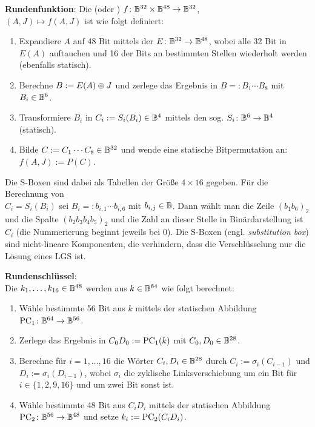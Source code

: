 \textbf{Rundenfunktion}:
Die  (oder )
$f\colon \mathbb{B}^{32} \times \mathbb{B}^{48} \rightarrow \mathbb{B}^{32}$,\\
$(A,J) \mapsto f(A,J)$
ist wie folgt definiert:
\begin{enumerate}
    \item
    Expandiere $A$ auf 48 Bit mittels der 
    $E\colon \mathbb{B}^{32} \rightarrow \mathbb{B}^{48}$,
    wobei alle 32 Bit in $E(A)$ auftauchen und 16 der Bits an bestimmten Stellen wiederholt werden
    (ebenfalls statisch).

    \item
    Berechne $B := E(A) \oplus J$ und zerlege das Ergebnis in $B =: B_1 \cdots B_8$ mit
    $B_i \in \mathbb{B}^6$.

    \item
    Transformiere $B_i$ in $C_i := S_i(B_i) \in \mathbb{B}^4$ mittels den sog. 
    $S_i\colon \mathbb{B}^6 \rightarrow \mathbb{B}^4$
    (statisch).

    \item
    Bilde $C := C_1 \cdots C_8 \in \mathbb{B}^{32}$ und wende eine statische Bitpermutation an:
    $f(A, J) := P(C)$.
\end{enumerate}
Die S-Boxen sind dabei als Tabellen der Größe $4 \times 16$ gegeben.
Für die Berechnung von\\
$C_i = S_i(B_i)$ sei $B_i =: b_{i,1} \cdots b_{i,6}$ mit
$b_{i,j} \in \mathbb{B}$.
Dann wählt man die Zeile $(b_1 b_6)_2$ und die Spalte $(b_2 b_3 b_4 b_5)_2$ und die Zahl an dieser
Stelle in Binärdarstellung ist $C_i$
(die Nummerierung beginnt jeweils bei $0$).
Die S-Boxen (engl. \emph{substitution box}) sind nicht-lineare Komponenten, die verhindern,
dass die Verschlüsselung nur die Lösung eines LGS ist.

\textbf{Rundenschlüssel}:\\
Die  $k_1, \dotsc, k_{16} \in \mathbb{B}^{48}$ werden aus
$k \in \mathbb{B}^{64}$ wie folgt berechnet:
\begin{enumerate}
    \item
    Wähle bestimmte 56 Bit aus $k$ mittels der statischen Abbildung
    $\operatorname{PC}_1\colon \mathbb{B}^{64} \rightarrow \mathbb{B}^{56}$.

    \item
    Zerlege das Ergebnis in $C_0 D_0 := \operatorname{PC}_1(k)$ mit $C_0, D_0 \in \mathbb{B}^{28}$.

    \item
    Berechne für $i = 1, \dotsc, 16$ die Wörter $C_i, D_i \in \mathbb{B}^{28}$ durch
    $C_i := \sigma_i(C_{i-1})$ und\\
    $D_i := \sigma_i(D_{i-1})$, wobei $\sigma_i$ die zyklische Linksverschiebung um ein Bit
    für $i \in \{1, 2, 9, 16\}$ und um zwei Bit sonst ist.

    \item
    Wähle bestimmte 48 Bit aus $C_i D_i$ mittels der statischen Abbildung
    $\operatorname{PC}_2\colon \mathbb{B}^{56} \rightarrow \mathbb{B}^{48}$ und setze
    $k_i := \operatorname{PC}_2(C_i D_i)$.
\end{enumerate}

